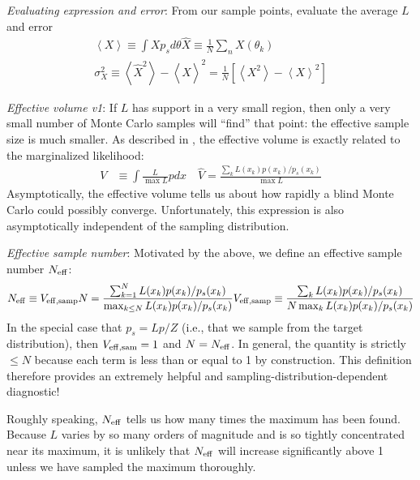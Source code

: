 \documentclass[twocolumn,prd,nofootinbib]{revtex4}
\begin{document}
\noindent \emph{Evaluating expression and error}: From our sample points, evaluate the average $L$ and error
\begin{subequations}
\begin{eqnarray}
\label{eq:EvaluateMCIntegral}
\left< X \right> \equiv \int X p_s d\theta 
\hat{X} \equiv \frac{1}{N} \sum_n X(\theta_k)\\ 
\label{eq:ErrorEstimateMC}\sigma_X^2 \equiv \left<\hat{X}^2\right> -\left<\hat{X}\right>^2 
 = \frac{1}{N}[\left<X^2\right> - \left<X\right>^2] 
\end{eqnarray}
\end{subequations}


\noindent \emph{Effective volume v1}: If $L$ has support in a very small region, then only a very small number of
Monte Carlo samples will ``find'' that point: the effective sample size is much smaller.  As described in \cite{gwastro-mergers-HeeSuk-CompareToPE-Aligned}, the
effective volume is exactly related to the marginalized likelihood:
\begin{align}
V           &\equiv \int \frac{L}{\max L} p dx  \quad \hat{V} = \frac{\sum_k L(x_k)p(x_k)/p_s(x_k)}{\max L}
\end{align}
Asymptotically, the effective volume tells us about how rapidly a blind Monte Carlo could possibly converge. 
%
Unfortunately, this expression is also asymptotically independent  of the sampling distribution. 


\noindent\emph{Effective sample number}: Motivated by the above, we define an effective sample number $N_{\rm eff}$:
\begin{align}
N_{\rm eff} & \equiv V_{\rm eff,samp} N = \frac{\sum_{k=1}^N L(x_k) p(x_k)/p_s(x_k)}{ \max_{k\le N} L(x_k)  p(x_k)/p_s(x_k)}
V_{\rm eff,samp} \equiv \frac{\sum_k L(x_k) p(x_k)/p_s(x_k)}{N \max_k L(x_k)  p(x_k)/p_s(x_k)} \\
\end{align}
In the special case that $p_s = Lp/Z$ (i.e., that we sample from the target distribution), then $V_{\rm eff,sam} = 1$
and $N=N_{\rm eff}$.  In general, the quantity is strictly $\le N$ because each term is less than or equal to 1 by
construction.  This definition therefore provides an extremely helpful and sampling-distribution-dependent diagnostic!

Roughly speaking, $N_{\rm eff}$ tells us how many times the maximum has been found.  Because $L$ varies by so many
orders of magnitude and is so tightly concentrated near its maximum, it is unlikely that $N_{\rm eff}$ will increase
significantly above 1 unless we have sampled the maximum thoroughly.
\end{document}
